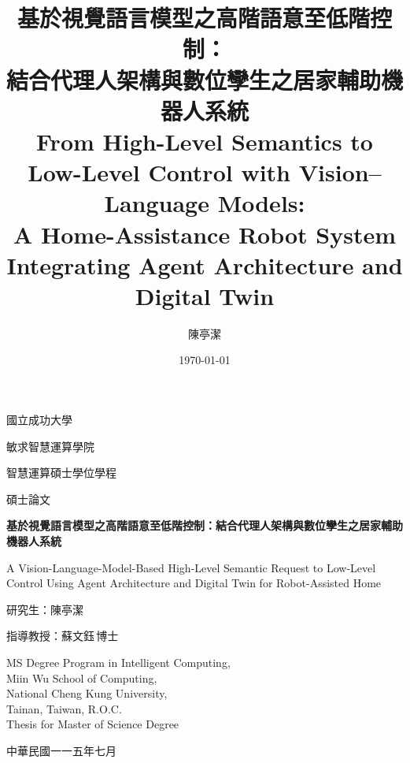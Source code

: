 \documentclass[12pt,a4paper]{article}
\title{\bfseries 基於視覺語言模型之高階語意至低階控制：\\結合代理人架構與數位孿生之居家輔助機器人系統\\[0.4em]
\large From High-Level Semantics to Low-Level Control with Vision--Language Models:\\
A Home-Assistance Robot System Integrating Agent Architecture and Digital Twin}
\author{陳亭潔}
\date{\today}
\begin{document}
\begin{titlepage}
\centering
{}
{\Large 國立成功大學\par}
{\Large 敏求智慧運算學院\par}
{\Large 智慧運算碩士學位學程\par}
{\Large 碩士論文\par}
\vspace{2.2cm}
{\LARGE\bfseries 基於視覺語言模型之高階語意至低階控制：結合代理人架構與數位孿生之居家輔助機器人系統\par}
\vspace{1.0em}
{\large A Vision-Language-Model-Based High-Level Semantic Request to Low-Level Control Using Agent Architecture and Digital Twin for Robot-Assisted Home\par}
\vspace{2.2cm}
{\large 研究生：陳亭潔\par}
\vspace{0.4em}
{\large 指導教授：蘇文鈺\,博士\par}
\vspace{2.0cm}
{MS Degree Program in Intelligent Computing,\\
Miin Wu School of Computing,\\
National Cheng Kung University,\\
Tainan, Taiwan, R.O.C.\\
Thesis for Master of Science Degree\par}
\vfill
{\large 中華民國一一五年七月\par}
\end{titlepage}

\pagestyle{plain}
\end{document}
